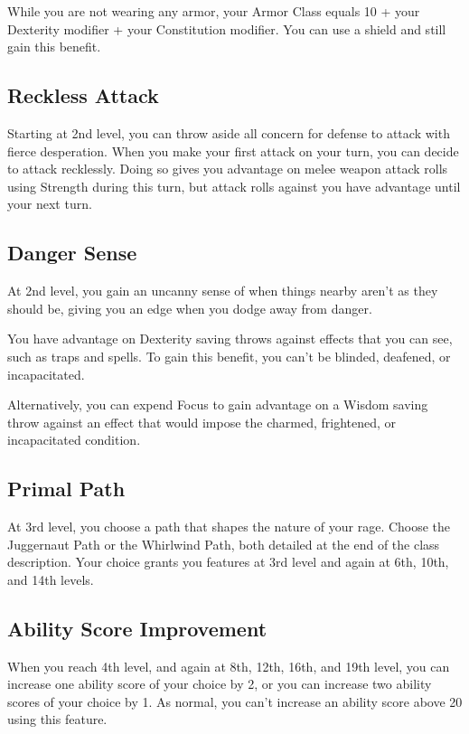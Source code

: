While you are not wearing any armor, your Armor Class equals 10 + your Dexterity modifier + your Constitution modifier. You can use a shield and still gain this benefit.

\subsection{Reckless Attack}

Starting at 2nd level, you can throw aside all concern for defense to attack with fierce desperation. When you make your first attack on your turn, you can decide to attack recklessly. Doing so gives you advantage on melee weapon attack rolls using Strength during this turn, but attack rolls against you have advantage until your next turn.

\subsection{Danger Sense}

At 2nd level, you gain an uncanny sense of when things nearby aren’t as they should be, giving you an edge when you dodge away from danger.

You have advantage on Dexterity saving throws against effects that you can see, such as traps and spells. To gain this benefit, you can’t be blinded, deafened, or incapacitated.

Alternatively, you can expend Focus to gain advantage on a Wisdom saving throw against an effect that would impose the charmed, frightened, or incapacitated condition.

\subsection{Primal Path}

At 3rd level, you choose a path that shapes the nature of your rage. Choose the Juggernaut Path or the Whirlwind Path, both detailed at the end of the class description. Your choice grants you features at 3rd level and again at 6th, 10th, and 14th levels.

\subsection{Ability Score Improvement}

When you reach 4th level, and again at 8th, 12th, 16th, and 19th level, you can increase one ability score of your choice by 2, or you can increase two ability scores of your choice by 1. As normal, you can’t increase an ability score above 20 using this feature.

